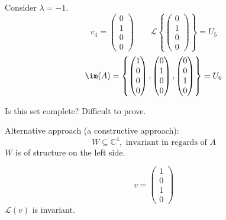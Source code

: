 \documentclass[a4paper]{article}
\theoremstyle{definition}
\newcommand\set[1]{\left\{#1\right\}}
\begin{document}
Consider $\lambda = -1$.
\[ v_4 = \begin{pmatrix} 0 \\ 1 \\ 0 \\ 0 \end{pmatrix} \qquad \mathcal L\set{\begin{pmatrix} 0 \\ 1 \\ 0 \\ 0 \end{pmatrix}} = U_5 \]
\[ \im(A) = \set{\begin{pmatrix} 1 \\ 0 \\ 0 \\ 0 \end{pmatrix}, \begin{pmatrix} 0 \\ 1 \\ 0 \\ 0 \end{pmatrix}, \begin{pmatrix} 0 \\ 0 \\ 1 \\ 0 \end{pmatrix}} = U_6 \]

Is this set complete?
Difficult to prove.


Alternative approach (a constructive approach):
\[ W \subseteq \mathbb C^4, \text{ invariant in regards of } A \]
$W$ is of structure on the left side.

\[ v = \begin{pmatrix} 1 \\ 0 \\ 1 \\ 0 \end{pmatrix} \]
$\mathcal L(v)$ is invariant.
\end{document}
